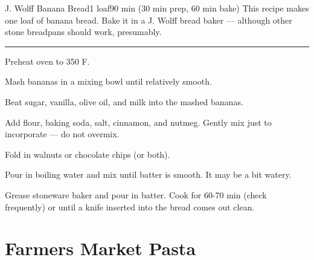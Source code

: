 \documentclass[openany]{book}
\begin{document}
\begin{recipe}[BananaBread]{J. Wolff Banana Bread}{1 loaf}{90 min (30 min prep, 60 min bake)}
\freeform This recipe makes one loaf of banana bread. Bake it in a J. Wolff bread baker --- although other stone breadpans should work, presumably.
\freeform\rule{\textwidth}{0.05pt}

\newstep Preheat oven to 350 \degrees F.

Mash bananas in a mixing bowl until relatively smooth.


Beat sugar, vanilla, olive oil, and milk into the mashed bananas.


Add flour, baking soda, salt, cinnamon, and nutmeg. Gently mix just to incorporate --- do not overmix.


Fold in walnuts or chocolate chips (or both).


Pour in boiling water and mix until batter is smooth. It may be a bit watery.

\newstep

Grease stoneware baker and pour in batter. Cook for 60-70 min (check frequently) or until a knife inserted into the bread comes out clean.
\end{recipe}

\chapter{Farmers Market Pasta}\label{farmers-market-pasta}
\end{document}

